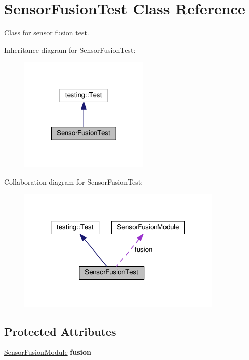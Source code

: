\hypertarget{class_sensor_fusion_test}{}\section{Sensor\+Fusion\+Test Class Reference}
\label{class_sensor_fusion_test}


Class for sensor fusion test.  




Inheritance diagram for Sensor\+Fusion\+Test\+:
\nopagebreak
\begin{figure}[H]
\begin{center}
\leavevmode
\includegraphics[width=176pt]{class_sensor_fusion_test__inherit__graph}
\end{center}
\end{figure}


Collaboration diagram for Sensor\+Fusion\+Test\+:
\nopagebreak
\begin{figure}[H]
\begin{center}
\leavevmode
\includegraphics[width=278pt]{class_sensor_fusion_test__coll__graph}
\end{center}
\end{figure}
\subsection*{Protected Attributes}
\begin{DoxyCompactItemize}
\item 
\hyperlink{class_sensor_fusion_module}{Sensor\+Fusion\+Module} {\bfseries fusion}\hypertarget{class_sensor_fusion_test_a2f23e29ade2dcdec5510cc2b893c9cc7}{}\label{class_sensor_fusion_test_a2f23e29ade2dcdec5510cc2b893c9cc7}

\end{DoxyCompactItemize}


